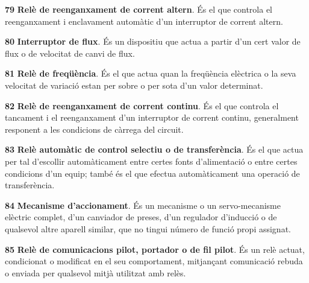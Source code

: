 \begin{multicols}{2}
\begin{list}{}
\item[\textbf{79}]   
\textbf{Rel\`{e} de
reenganxament de corrent altern}. \'{E}s el que controla el reenganxament i enclavament autom\`{a}tic d'un
interruptor de corrent altern.

\item[\textbf{80}]   
\textbf{Interruptor de flux}. \'{E}s un dispositiu que actua a partir d'un cert valor de flux o de velocitat de canvi de flux.

\item[\textbf{81}]   
\textbf{Rel\`{e} de freq\"{u}\`{e}ncia}. \'{E}s el que actua
quan la freq\"{u}\`{e}ncia el\`{e}ctrica o la seva velocitat de variaci\'{o} estan per sobre o per sota d'un valor determinat.

\item[\textbf{82}]   
\textbf{Rel\`{e} de
reenganxament de corrent continu}. \'{E}s el que controla el tancament i el reenganxament d'un
interruptor de corrent continu, generalment responent a les condicions de c\`{a}rrega del
circuit.

\item[\textbf{83}]  
\textbf{Rel\`{e} autom\`{a}tic de control selectiu o de transfer\`{e}ncia}. \'{E}s
el que actua per tal d'escollir autom\`{a}ticament entre certes fonts
d'alimentaci\'{o} o entre certes condicions d'un equip; tamb\'{e} \'{e}s el que
efectua autom\`{a}ticament una operaci\'{o} de transfer\`{e}ncia.

\item[\textbf{84}]   
\textbf{Mecanisme d'accionament}. \'{E}s un
mecanisme o un servo-mecanisme el\`{e}ctric complet,  d'un canviador de
preses, d'un regulador d'inducci\'{o} o de qualsevol altre aparell
similar, que no tingui n\'{u}mero de funci\'{o} propi assignat.

\item[\textbf{85}]   
\textbf{Rel\`{e} de comunicacions pilot, portador o de fil pilot}. \'{E}s un rel\`{e} actuat, condicionat o modificat en el seu comportament, mitjan\c{c}ant comunicaci\'{o} rebuda o enviada per qualsevol mitj\`{a} utilitzat amb rel\`{e}s.


\end{list}
\end{multicols}
